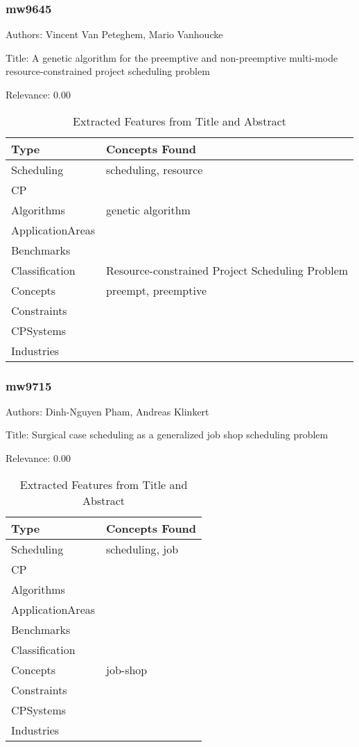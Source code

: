 \subsubsection{mw9645}
\label{mw:mw9645}

Authors: Vincent Van Peteghem, Mario Vanhoucke

Title: A genetic algorithm for the preemptive and non-preemptive multi-mode resource-constrained project scheduling problem

Relevance:  0.00

{\scriptsize
\begin{longtable}{p{2cm}p{20cm}}
\caption{Extracted Features from Title and Abstract}\\ \toprule
Type & Concepts Found\\ \midrule
\endhead
\bottomrule
\endfoot
Scheduling & scheduling, resource\\ 
CP & \\ 
Algorithms & genetic algorithm\\ 
ApplicationAreas & \\ 
Benchmarks & \\ 
Classification & Resource-constrained Project Scheduling Problem\\ 
Concepts & preempt, preemptive\\ 
Constraints & \\ 
CPSystems & \\ 
Industries & \\ 
\end{longtable}
}



\subsubsection{mw9715}
\label{mw:mw9715}

Authors: Dinh-Nguyen Pham, Andreas Klinkert

Title: Surgical case scheduling as a generalized job shop scheduling problem

Relevance:  0.00

{\scriptsize
\begin{longtable}{p{2cm}p{20cm}}
\caption{Extracted Features from Title and Abstract}\\ \toprule
Type & Concepts Found\\ \midrule
\endhead
\bottomrule
\endfoot
Scheduling & scheduling, job\\ 
CP & \\ 
Algorithms & \\ 
ApplicationAreas & \\ 
Benchmarks & \\ 
Classification & \\ 
Concepts & job-shop\\ 
Constraints & \\ 
CPSystems & \\ 
Industries & \\ 
\end{longtable}
}



